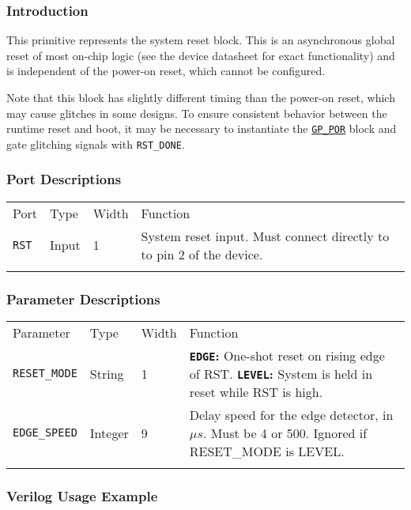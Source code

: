 \documentclass[11pt]{article}
\newcommand{\tokenstyle}[1]{\texttt{#1}}
\newcommand{\valuestyle}[1]{\texttt{#1}}
\newcommand{\strvaluestyle}[1]{\valuestyle{\textquotedbl#1\textquotedbl}}
\newcommand{\strexamplestyle}[1]{\textbf{\strvaluestyle{#1}:}}
\newcommand{\whenstyle}[1]{{\fontseries{sb}\selectfont#1}}
\newcommand{\tokenref}[2]{\hyperref[#2]{\tokenstyle{#1}}}
\newcommand{\thinhline}{\Xhline{1\arrayrulewidth}}
\newcommand{\thickhline}{\Xhline{2.5\arrayrulewidth}}
\begin{document}
\subsubsection{Introduction}
This primitive represents the system reset block. This is an asynchronous global reset of most on-chip logic (see the
device datasheet for exact functionality) and is independent of the power-on reset, which cannot be configured.

Note that this block has slightly different timing than the power-on reset, which may cause glitches in some designs.
To ensure consistent behavior between the runtime reset and boot, it may be necessary to instantiate the
\tokenref{GP\_POR}{gp-por} block and gate glitching signals with \tokenstyle{RST\_DONE}.

\subsubsection{Port Descriptions}

\begin{tabularx}{\textwidth}{lllX}
\thinhline
\whenstyle{Port} & \whenstyle{Type} & \whenstyle{Width} & \whenstyle{Function} \\
\thickhline
\tokenstyle{RST} & Input & 1 & System reset input. Must connect directly to to pin 2 of the device.\\
\thinhline
\end{tabularx}

\subsubsection{Parameter Descriptions}

\begin{tabularx}{\textwidth}{lllX}
\thinhline
\whenstyle{Parameter} & \whenstyle{Type} & \whenstyle{Width} & \whenstyle{Function} \\
\thickhline
\tokenstyle{RESET\_MODE} & String & 1 &
	\strexamplestyle{EDGE} One-shot reset on rising edge of RST. \newline
	\strexamplestyle{LEVEL} System is held in reset while RST is high.\\
\tokenstyle{EDGE\_SPEED} & Integer & 9 &
	Delay speed for the edge detector, in $\mu s$. Must be 4 or 500. \newline
	Ignored if RESET\_MODE is LEVEL.\\
\thinhline
\end{tabularx}

\subsubsection{Verilog Usage Example}
\end{document}
